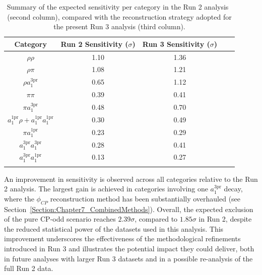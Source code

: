 \begin{table}[!htbp]
\centering
\renewcommand{\arraystretch}{1.5} %
\setlength{\tabcolsep}{10pt} %
\begin{tabular}{ccccc}
\hline
Category & Run 2 Sensitivity ($\sigma$) & Run 3 Sensitivity ($\sigma$)\\
\hline
$\rho\rho$       & 1.10 & 1.36 \\
\arrayrulecolor{lightgray} \hline
$\rho \pi$       & 1.08 & 1.21 \\
\arrayrulecolor{lightgray} \hline
$\rho a_1^\text{3pr}$       & 0.65 & 1.12 \\
\arrayrulecolor{lightgray} \hline
$\pi\pi$       & 0.39 &  0.41 \\
\arrayrulecolor{lightgray} \hline
$\pi a_1^\text{3pr}$  & 0.48 & 0.70 \\
\arrayrulecolor{lightgray} \hline
$a_1^\text{1pr}\rho + a_1^\text{1pr}a_1^\text{1pr}$  & 0.30 & 0.49 \\
\arrayrulecolor{lightgray} \hline
$\pi a_1^\text{1pr}$       & 0.23 & 0.29 \\
\arrayrulecolor{lightgray} \hline
$a_1^\text{3pr} a_1^\text{3pr}$       & 0.28 & 0.41 \\
\arrayrulecolor{lightgray} \hline
$a_1^\text{3pr} a_1^\text{1pr}$       & 0.13 & 0.27 \\
\arrayrulecolor{black} \hline
\end{tabular}
\caption[Comparison of per-category sensitivities in Run 2 with reconstruction strategies in Run 3.]
{Summary of the expected sensitivity per category in the Run 2 analysis~\cite{HiggsCP_CMS_2021} (second column), compared with the reconstruction strategy adopted for the present Run 3 analysis (third column).}
\label{Table:Chapter7_Run2Run3_PerCat_Comp}
\end{table}

An improvement in sensitivity is observed across all categories relative to the Run 2 analysis. The largest gain is achieved in categories involving one $a_1^{3\mathrm{pr}}$ decay, where the $\phi_{CP}$ reconstruction method has been substantially overhauled (see Section~\ref{Section:Chapter7_CombinedMethods}). Overall, the expected exclusion of the pure CP-odd scenario reaches $2.39\sigma$, compared to $1.85\sigma$ in Run 2, despite the reduced statistical power of the datasets used in this analysis. This improvement underscores the effectiveness of the methodological refinements introduced in Run 3 and illustrates the potential impact they could deliver, both in future analyses with larger Run 3 datasets and in a possible re-analysis of the full Run 2 data.

